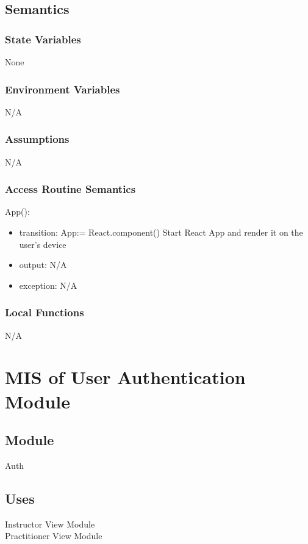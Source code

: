 \documentclass[12pt, titlepage]{article}
\begin{document}
\subsection{Semantics}

\subsubsection{State Variables}
None

\subsubsection{Environment Variables}
N/A

\subsubsection{Assumptions}
N/A

\subsubsection{Access Routine Semantics}

\noindent App():
\begin{itemize}
  \item transition: App:= React.component() Start React App and render it on the user's device
  \item output: N/A
  \item exception: N/A
\end{itemize}

\subsubsection{Local Functions}
N/A

\section{MIS of User Authentication Module}
\label{sec:userauth}

\subsection{Module}
Auth

\subsection{Uses}
Instructor View Module\\
Practitioner View Module
\end{document}
